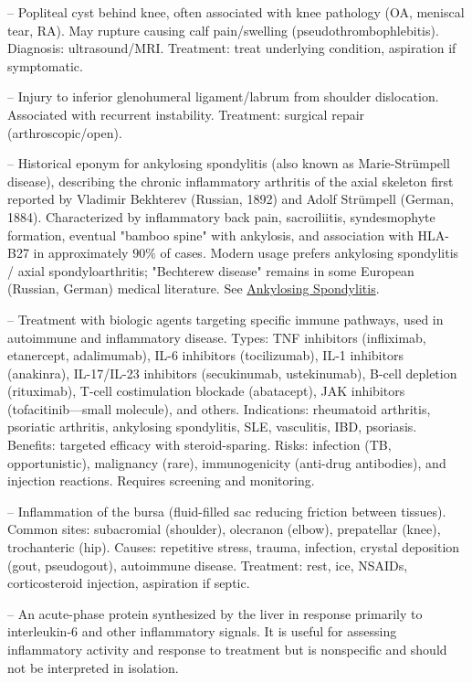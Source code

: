 -- Popliteal cyst behind knee, often associated with knee pathology (OA, meniscal tear, RA). May rupture causing calf pain/swelling (pseudothrombophlebitis). Diagnosis: ultrasound/MRI. Treatment: treat underlying condition, aspiration if symptomatic.

-- Injury to inferior glenohumeral ligament/labrum from shoulder dislocation. Associated with recurrent instability. Treatment: surgical repair (arthroscopic/open).

-- Historical eponym for ankylosing spondylitis (also known as Marie-Strümpell disease), describing the chronic inflammatory arthritis of the axial skeleton first reported by Vladimir Bekhterev (Russian, 1892) and Adolf Strümpell (German, 1884). Characterized by inflammatory back pain, sacroiliitis, syndesmophyte formation, eventual "bamboo spine" with ankylosis, and association with HLA-B27 in approximately $90\%$ of cases. Modern usage prefers ankylosing spondylitis / axial spondyloarthritis; "Bechterew disease" remains in some European (Russian, German) medical literature. See \hyperlink{Ankylosing Spondylitis}{Ankylosing Spondylitis}.


-- Treatment with biologic agents targeting specific immune pathways, used in autoimmune and inflammatory disease. Types: TNF inhibitors (infliximab, etanercept, adalimumab), IL-6 inhibitors (tocilizumab), IL-1 inhibitors (anakinra), IL-17/IL-23 inhibitors (secukinumab, ustekinumab), B-cell depletion (rituximab), T-cell costimulation blockade (abatacept), JAK inhibitors (tofacitinib—small molecule), and others. Indications: rheumatoid arthritis, psoriatic arthritis, ankylosing spondylitis, SLE, vasculitis, IBD, psoriasis. Benefits: targeted efficacy with steroid-sparing. Risks: infection (TB, opportunistic), malignancy (rare), immunogenicity (anti-drug antibodies), and injection reactions. Requires screening and monitoring.

-- Inflammation of the bursa (fluid-filled sac reducing friction between tissues). Common sites: subacromial (shoulder), olecranon (elbow), prepatellar (knee), trochanteric (hip). Causes: repetitive stress, trauma, infection, crystal deposition (gout, pseudogout), autoimmune disease. Treatment: rest, ice, NSAIDs, corticosteroid injection, aspiration if septic.

-- An acute-phase protein synthesized by the liver in response primarily to interleukin-6 and other inflammatory signals. It is useful for assessing inflammatory activity and response to treatment but is nonspecific and should not be interpreted in isolation.

